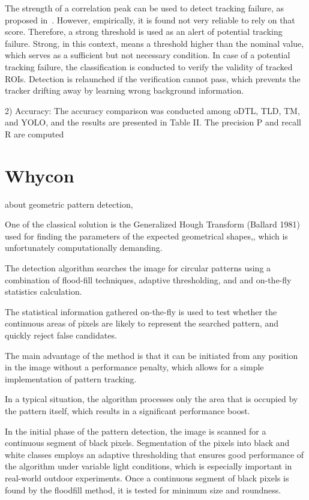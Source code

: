 \documentclass[a4paper]{report}
\begin{document}
The strength of a correlation peak can be used to detect tracking failure, as proposed in~\cite{MOSSE}. However, empirically, it is found not very reliable to rely on that score. Therefore, a strong threshold is used as an alert of potential tracking failure. Strong, in this context, means a threshold higher than the nominal value, which serves as a sufficient but not necessary condition. In case of a potential tracking failure, the classification is conducted to verify the validity of tracked ROIs. Detection is relaunched if the verification cannot pass, which prevents the tracker drifting away by learning wrong background information.



2) Accuracy: The accuracy comparison was conducted
among oDTL, TLD, TM, and YOLO, and the results are presented
in Table II. The precision P and recall R are computed

\section{Whycon}
about geometric pattern detection,

One of the classical solution is the Generalized Hough Transform (Ballard 1981) used for finding the parameters of the expected geometrical shapes,, which is
unfortunately computationally demanding.


The detection algorithm searches the image for circular patterns using a combination of flood-fill techniques, adaptive thresholding, and and on-the-fly statistics calculation.

The statistical information gathered on-the-fly is used to test
whether the continuous areas of pixels are likely to represent
the searched pattern, and quickly reject false candidates. 


The main advantage of the method is that it can be initiated from
any position in the image without a performance penalty,
which allows for a simple implementation of pattern tracking.


In a typical situation, the algorithm processes only the area that is occupied by the pattern itself, which results in a significant performance boost.

In the initial phase of the pattern detection, the image is scanned for a continuous segment of black pixels. Segmentation of the pixels into black and white classes employs an adaptive thresholding that ensures good performance of the algorithm under variable light conditions, which is especially important in real-world outdoor experiments. Once a continuous segment of black pixels is found by the floodfill
method, it is tested for minimum size and roundness.
\end{document}
